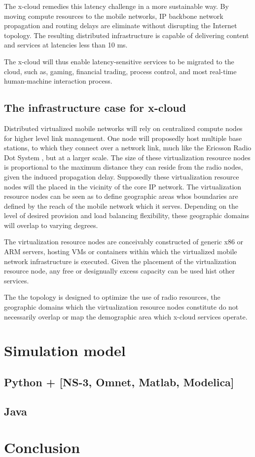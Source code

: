 \documentclass[conference]{IEEEtran}
\newcommand{\xcloud}{x-cloud }
\begin{document}
The \xcloud remedies this latency challenge in a more sustainable way. By moving compute resources to the mobile networks, IP backbone network propagation and routing delays are eliminate without disrupting the Internet topology. The resulting distributed infrastructure is capable of delivering content and services at latencies less than 10 ms. 

The \xcloud will thus enable latency-sensitive services to be migrated to the cloud, such as, gaming, financial trading, process control, and most real-time human-machine interaction process.

\subsection{The infrastructure case for \xcloud}
Distributed virtualized mobile networks will rely on centralized compute nodes for higher level link management. One node will proposedly host multiple base stations, to which they connect over a network link, much like the Ericsson Radio Dot System \cite{ericsson_dot}, but at a larger scale. The size of these virtualization resource nodes is proportional to the maximum distance they can reside from the radio nodes, given the induced propagation delay. Supposedly these virtualization resource nodes will the placed in the vicinity of the core IP network. The virtualization resource nodes can be seen as to define geographic areas whos boundaries are defined by the reach of the mobile network which it serves. Depending on the level of desired provision and load balancing flexibility, these geographic domains will overlap to varying degrees.

The virtualization resource nodes are conceivably constructed of generic x86 or ARM servers, hosting VMs or containers within which the virtualized mobile network infrastructure is executed. Given the placement of the virtualization resource node, any free or designually excess capacity can be used hist other services.

The the topology is designed to optimize the use of radio resources, the geographic domains which the virtualization resource nodes constitute do not necessarily overlap or map the demographic area which \xcloud services operate.

\section{Simulation model}

\subsection{Python + [NS-3, Omnet, Matlab, Modelica]}

\subsection{Java}

\section{Conclusion}




\end{document}
